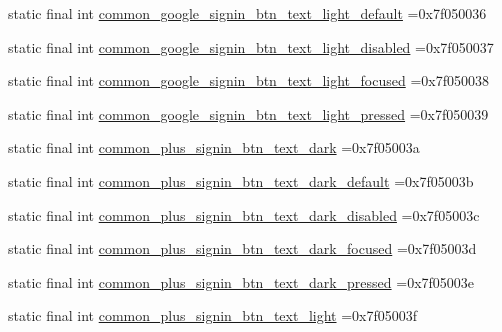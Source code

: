 \begin{DoxyCompactItemize}
\item 
static final int \mbox{\hyperlink{classbr_1_1unb_1_1cic_1_1mp_1_1marketmaster_1_1R_1_1color_a84df238d0aca8b268aa3b0e3a39b93a9}{common\+\_\+google\+\_\+signin\+\_\+btn\+\_\+text\+\_\+light\+\_\+default}} =0x7f050036
\item 
static final int \mbox{\hyperlink{classbr_1_1unb_1_1cic_1_1mp_1_1marketmaster_1_1R_1_1color_a57938c371316eafad75bd30b3f1d353a}{common\+\_\+google\+\_\+signin\+\_\+btn\+\_\+text\+\_\+light\+\_\+disabled}} =0x7f050037
\item 
static final int \mbox{\hyperlink{classbr_1_1unb_1_1cic_1_1mp_1_1marketmaster_1_1R_1_1color_a387093f6dd4de3dd0afacb4a13fabe90}{common\+\_\+google\+\_\+signin\+\_\+btn\+\_\+text\+\_\+light\+\_\+focused}} =0x7f050038
\item 
static final int \mbox{\hyperlink{classbr_1_1unb_1_1cic_1_1mp_1_1marketmaster_1_1R_1_1color_a00b40dda832bb79e0b6a3898a4782d92}{common\+\_\+google\+\_\+signin\+\_\+btn\+\_\+text\+\_\+light\+\_\+pressed}} =0x7f050039
\item 
static final int \mbox{\hyperlink{classbr_1_1unb_1_1cic_1_1mp_1_1marketmaster_1_1R_1_1color_a8eec01e0c79c1b3cc9c0e72148180731}{common\+\_\+plus\+\_\+signin\+\_\+btn\+\_\+text\+\_\+dark}} =0x7f05003a
\item 
static final int \mbox{\hyperlink{classbr_1_1unb_1_1cic_1_1mp_1_1marketmaster_1_1R_1_1color_a7fcc227619f30f0ee42f74a962049ac3}{common\+\_\+plus\+\_\+signin\+\_\+btn\+\_\+text\+\_\+dark\+\_\+default}} =0x7f05003b
\item 
static final int \mbox{\hyperlink{classbr_1_1unb_1_1cic_1_1mp_1_1marketmaster_1_1R_1_1color_a5160ea25143151dadc22c7e25c346592}{common\+\_\+plus\+\_\+signin\+\_\+btn\+\_\+text\+\_\+dark\+\_\+disabled}} =0x7f05003c
\item 
static final int \mbox{\hyperlink{classbr_1_1unb_1_1cic_1_1mp_1_1marketmaster_1_1R_1_1color_a081974ccc1e806eac2def659d12ea254}{common\+\_\+plus\+\_\+signin\+\_\+btn\+\_\+text\+\_\+dark\+\_\+focused}} =0x7f05003d
\item 
static final int \mbox{\hyperlink{classbr_1_1unb_1_1cic_1_1mp_1_1marketmaster_1_1R_1_1color_a1056d37dd5f748835d8dbb426aacbd18}{common\+\_\+plus\+\_\+signin\+\_\+btn\+\_\+text\+\_\+dark\+\_\+pressed}} =0x7f05003e
\item 
static final int \mbox{\hyperlink{classbr_1_1unb_1_1cic_1_1mp_1_1marketmaster_1_1R_1_1color_abe30ab321b04d368142190443e79107d}{common\+\_\+plus\+\_\+signin\+\_\+btn\+\_\+text\+\_\+light}} =0x7f05003f
\item 

\end{DoxyCompactItemize}
